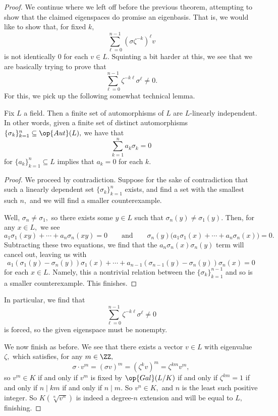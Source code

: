 \documentclass[../notes.tex]{subfiles}
\begin{document}
\begin{proof}
	We continue where we left off before the previous theorem, attempting to show that the claimed eigenspaces do promise an eigenbasis. That is, we would like to show that, for fixed $k,$
	\[\sum_{\ell=0}^{n-1}\left(\sigma\zeta^{-k}\right)^\ell v\]
	is not identically $0$ for each $v\in L.$ Squinting a bit harder at this, we see that we are basically trying to prove that
	\[\sum_{\ell=0}^{n-1}\zeta^{-k\ell}\sigma^\ell\ne0.\]
	For this, we pick up the following somewhat technical lemma.
	\begin{lemma} \label{lem:linindauto}
		Fix $L$ a field. Then a finite set of automorphisms of $L$ are $L$-linearly independent. In other words, given a finite set of distinct automorphisms $\{\sigma_k\}_{k=1}^n\subseteq\op{Aut}(L),$ we have that
		\[\sum_{k=1}^na_k\sigma_k=0\]
		for $\{a_k\}_{k=1}^n\subseteq L$ implies that $a_k=0$ for each $k.$
	\end{lemma}
	\begin{proof}
		We proceed by contradiction. Suppose for the sake of contradiction that such a linearly dependent set $\{\sigma_k\}_{k=1}^n$ exists, and find a set with the smallest such $n,$ and we will find a smaller counterexample.
		
		Well, $\sigma_n\ne\sigma_1,$ so there exists some $y\in L$ such that $\sigma_n(y)\ne\sigma_1(y).$ Then, for any $x\in L,$ we see
		\[a_1\sigma_1(xy)+\cdots+a_n\sigma_n(xy)=0\qquad\text{and}\qquad\sigma_n(y)\big(a_1\sigma_1(x)+\cdots+a_n\sigma_n(x)\big)=0.\]
		Subtracting these two equations, we find that the $a_n\sigma_n(x)\sigma_n(y)$ term will cancel out, leaving us with
		\[a_1(\sigma_1(y)-\sigma_n(y))\sigma_1(x)+\cdots+a_{n-1}(\sigma_{n-1}(y)-\sigma_n(y))\sigma_n(x)=0\]
		for each $x\in L.$ Namely, this a nontrivial relation between the $\{\sigma_k\}_{k=1}^{n-1}$ and so is a smaller counterexample. This finishes.
	\end{proof}
	In particular, we find that
	\[\sum_{\ell=0}^{n-1}\zeta^{-k\ell}\sigma^\ell\ne0\]
	is forced, so the given eigenspace must be nonempty.

	We now finish as before. We see that there exists a vector $v\in L$ with eigenvalue $\zeta,$ which satisfies, for any $m\in\ZZ,$
	\[\sigma\cdot v^m=(\sigma v)^m=(\zeta^k v)^m=\zeta^{km}v^m,\]
	so $v^m\in K$ if and only if $v^m$ is fixed by $\op{Gal}(L/K)$ if and only if $\zeta^{km}=1$ if and only if $n\mid km$ if and only if $n\mid m.$ So $v^n\in K,$ and $n$ is the least such positive integer. So $K(\sqrt[n]{v^n})$ is indeed a degree-$n$ extension and will be equal to $L,$ finishing.
\end{proof}
\end{document}
